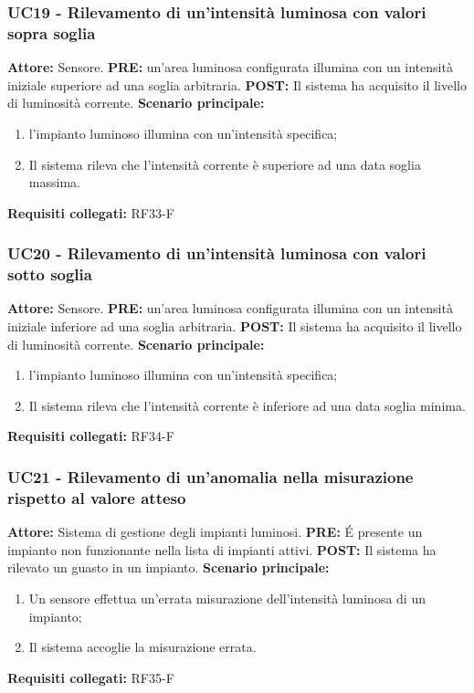 \documentclass[a4paper, 12pt]{article}
\begin{document}
\subsubsection{UC19 - Rilevamento di un'intensità luminosa con valori sopra soglia}
\textbf{Attore:} Sensore.\newline
\textbf{PRE:} un'area luminosa configurata illumina con un intensità iniziale superiore ad una soglia arbitraria.\newline
\textbf{POST:} Il sistema ha acquisito il livello di luminosità corrente. \newline
\textbf{Scenario principale:}
\begin{enumerate}
    \item l'impianto luminoso illumina con un'intensità specifica;
    \item Il sistema rileva che l'intensità corrente è superiore ad una data soglia massima.
\end{enumerate}
\textbf{Requisiti collegati:} RF33-F\newline

\subsubsection{UC20 - Rilevamento di un'intensità luminosa con valori sotto soglia}
\textbf{Attore:} Sensore.\newline
\textbf{PRE:} un'area luminosa configurata illumina con un intensità iniziale inferiore ad una soglia arbitraria.\newline
\textbf{POST:} Il sistema ha acquisito il livello di luminosità corrente. \newline
\textbf{Scenario principale:}
\begin{enumerate}
    \item l'impianto luminoso illumina con un'intensità specifica;
    \item Il sistema rileva che l'intensità corrente è inferiore ad una data soglia minima.
\end{enumerate}
\textbf{Requisiti collegati:} RF34-F\newline

\subsubsection{UC21 - Rilevamento di un'anomalia nella misurazione rispetto al valore atteso}
\textbf{Attore:} Sistema di gestione degli impianti luminosi.\newline
\textbf{PRE:} \'E presente un impianto non funzionante nella lista di impianti attivi.\newline
\textbf{POST:} Il sistema ha rilevato un guasto in un impianto. \newline
\textbf{Scenario principale:}
\begin{enumerate}
    \item Un sensore effettua un'errata misurazione dell'intensità luminosa di un impianto;
    \item Il sistema accoglie la misurazione errata.
\end{enumerate}
\textbf{Requisiti collegati:} RF35-F\newline
\end{document}

